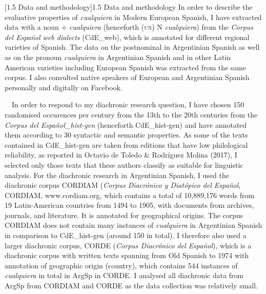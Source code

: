 \documentclass[10pt]{article}
\makeatletter
\renewcommand\subsection{\@startsection{subsection}{2}{0.0cm}{0.25in}{0.1665in}{\normalfont\normalsize\fontsize{12pt}{14.4pt}\selectfont\bfseries\raggedright}}
\newenvironment{styleStandard}{\renewcommand\baselinestretch{1.25}\setlength\leftskip{0cm}\setlength\rightskip{0cm}\setlength\parindent{0cm}\setlength\parfillskip{0pt plus 1fil}\setlength\parskip{0in plus 1pt}\writerlistparindent\writerlistleftskip\leavevmode\normalfont\normalsize\fontsize{12pt}{14.4pt}\selectfont\writerlistlabel\ignorespaces}{\unskip\vspace{0in plus 1pt}\par}
\newcommand\writerlistleftskip{}
\newcommand\writerlistparindent{}
\newcommand\writerlistlabel{}
\makeatother
\begin{document}
\subsection[1.5 Data and methodology]{1.5 Data and methodology}
\begin{styleStandard}
In order to describe the evaluative properties of \textit{cualquiera} in Modern European Spanish, I have extracted data with a noun +\textit{ cualquiera} (henceforth (\textsc{un)} N \textit{cualquiera}) from the \textit{Corpus del Español web dialects} (CdE\_web), which is annotated for different regional varieties of Spanish. The data on the postnominal in Argentinian Spanish as well as on the pronoun \textit{cualquiera} in Argentinian Spanish and in other Latin American varieties including European Spanish was extracted from the same corpus. I also consulted native speakers of European and Argentinian Spanish personally and digitally on Facebook.
\end{styleStandard}

\begin{styleStandard}
\ \ In order to respond to my diachronic research question, I have chosen 150 randomised occurences per century from the 13th to the 20th centuries from the \textit{Corpus del Español\_hist-gen} (henceforth CdE\_hist-gen) and have annotated them according to 30 syntactic and semantic properties. As some of the texts contained in CdE\_hist-gen are taken from editions that have low philological reliability, as reported in Octavio de Toledo \& Rodríguez Molina (2017), I selected only those texts that these authors classify as suitable for linguistic analysis. For the diachronic research in Argentinian Spanish, I used the diachronic corpus CORDIAM (\textit{Corpus Diacrónico y Diatópico del Español}, CORDIAM, www.cordiam.org, which contains a total of 10,889,176 words from 19 Latin-American countries from 1494 to 1905, with documents from archives, journals, and literature. It is annotated for geographical origins. The corpus CORDIAM does not contain many instances of \textit{cualquiera} in Argentinian Spanish in comparison to CdE\_hist-gen (around 150 in total). I therefore also used a larger diachronic corpus, CORDE (\textit{Corpus Diacrónico del Español}), which is a diachronic corpus with written texts spanning from Old Spanish to 1974 with annotation of geographic origin (country), which contains 544 instances of \textit{cualquiera} in total in ArgSp in CORDE. I analysed all diachronic data from ArgSp from CORDIAM and CORDE as the data collection was relatively small. 
\end{styleStandard}
\end{document}
